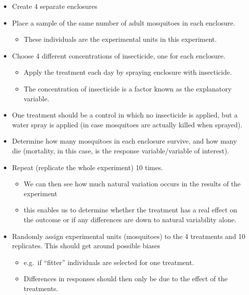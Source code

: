 \documentclass[
  oneside]{krantz}
\providecommand{\tightlist}{%
  \setlength{\itemsep}{0pt}\setlength{\parskip}{0pt}}
\begin{document}
\begin{itemize}
\item
  Create 4 separate enclosures
\item
  Place a sample of the same number of adult mosquitoes in each enclosure.

  \begin{itemize}
  \tightlist
  \item
    These individuals are the experimental units in this experiment.
  \end{itemize}
\item
  Choose 4 different concentrations of insecticide, one for each enclosure.

  \begin{itemize}
  \tightlist
  \item
    Apply the treatment each day by spraying enclosure with insecticide.
  \item
    The concentration of insecticide is a factor known as the explanatory variable.
  \end{itemize}
\item
  One treatment should be a control in which no insecticide is applied, but a water spray is applied (in case mosquitoes are actually killed when sprayed).
\item
  Determine how many mosquitoes in each enclosure survive, and how many die (mortality, in this case, is the response variable/variable of interest).
\item
  Repeat (replicate the whole experiment) 10 times.

  \begin{itemize}
  \tightlist
  \item
    We can then see how much natural variation occurs in the results of the experiment
  \item
    this enables us to determine whether the treatment has a real effect on the outcome or if any differences are down to natural variability alone.
  \end{itemize}
\item
  Randomly assign experimental units (mosquitoes) to the 4 treatments and 10 replicates. This should get around possible biases

  \begin{itemize}
  \tightlist
  \item
    e.g.~if ``fitter'' individuals are selected for one treatment.
  \item
    Differences in responses should then only be due to the effect of the treatments.
  \end{itemize}
\end{itemize}
\end{document}
